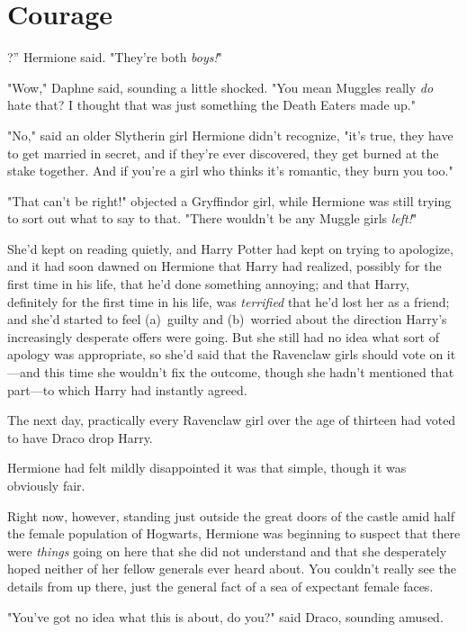 \chapter{Courage}

?'' Hermione said. "They're both \emph{boys!}"

\quad\quad
"Wow," Daphne said, sounding a little shocked. "You mean Muggles really
\emph{do} hate that? I thought that was just something the Death Eaters made
up."

"No," said an older Slytherin girl Hermione didn't recognize, "it's true, they
have to get married in secret, and if they're ever discovered, they get burned
at the stake together. And if you're a girl who thinks it's romantic, they burn
you too."

"That can't be right!" objected a Gryffindor girl, while Hermione was still
trying to sort out what to say to that. "There wouldn't be any Muggle girls
\emph{left!}"

She'd kept on reading quietly, and Harry Potter had kept on trying to
apologize, and it had soon dawned on Hermione that Harry had realized, possibly
for the first time in his life, that he'd done something annoying; and that
Harry, definitely for the first time in his life, was \emph{terrified} that
he'd lost her as a friend; and she'd started to feel (a)~guilty and (b)~worried
about the direction Harry's increasingly desperate offers were going. But she
still had no idea what sort of apology was appropriate, so she'd said that the
Ravenclaw girls should vote on it---and this time she wouldn't fix the outcome,
though she hadn't mentioned that part---to which Harry had instantly agreed.

The next day, practically every Ravenclaw girl over the age of thirteen had
voted to have Draco drop Harry.

Hermione had felt mildly disappointed it was that simple, though it was
obviously fair.

Right now, however, standing just outside the great doors of the castle amid
half the female population of Hogwarts, Hermione was beginning to suspect that
there were \emph{things} going on here that she did not understand and that she
desperately hoped neither of her fellow generals ever heard about.
\later
You couldn't really see the details from up there, just the general fact of a
sea of expectant female faces.

"You've got no idea what this is about, do you?" said Draco, sounding amused.


